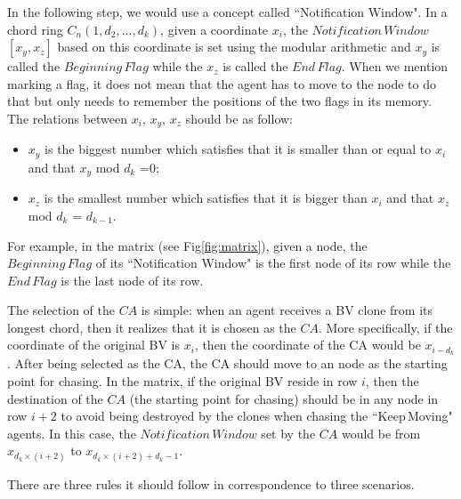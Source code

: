 In the following step, we would use a concept called ``Notification Window". In a chord ring $C_n(1, d_2, \ldots, d_k)$, given a coordinate $x_i$, the $Notification\,Window$ $[x_y,x_z]$ based on this coordinate is set using the modular arithmetic and $x_y$ is called the $Beginning\,Flag$ while the $x_z$ is called the $End\,Flag$. When we mention marking a flag, it does not mean that the agent has to move to the node to do that but only needs to remember the positions of the two flags in its memory.
The relations between $x_i$, $x_y$, $x_z$ should be as follow: 
\begin{itemize}
\item $x_y$ is the biggest number which satisfies that it is smaller than or equal to $x_i$ and that $x_y$ mod $d_k$ =$0$; 
\item $x_z$ is the smallest number which satisfies that it is bigger than $x_i$ and that $x_z$ mod $d_k$ = $d_{k-1}$.
\end{itemize} 

For example, in the matrix (see Fig\ref{fig:matrix}), given a node, the $Beginning\,Flag$ of its ``Notification Window" is the first node of its row while the $End\,Flag$ is the last node of its row.

The selection of the $CA$ is simple: when an agent receives a BV clone from its longest chord, then it realizes that it is chosen as the $CA$. More specifically, if the coordinate of the original BV is $x_i$, then the coordinate of the CA would be $x_{i-d_k}$.
After being selected as the CA, the CA should move to an node as the starting point for chasing. In the matrix, if the original BV reside in row $i$, then the destination of the $CA$ (the starting point for chasing) should be in any node in row $i+2$ to avoid being destroyed by the clones when chasing the ``Keep\,Moving" agents. In this case, the $Notification\,Window$ set by the $CA$ would be from $x_{d_k\times(i+2)}$ to $x_{d_k\times(i+2) + d_{k}-1}$.

There are three rules it should follow in correspondence to three scenarios.  

